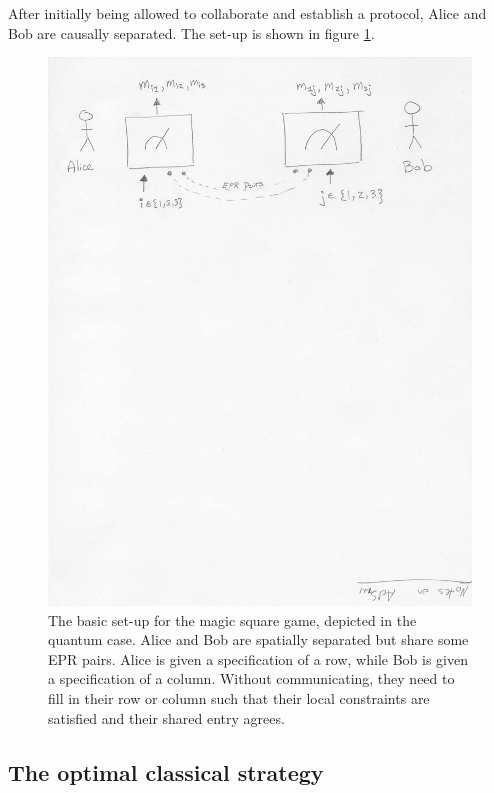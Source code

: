 \documentclass[a4paper,11pt]{article}
\begin{document}
After initially being allowed to collaborate and establish a protocol, Alice and Bob are causally separated. The set-up is shown in figure \ref{fig:setup}. 

\begin{figure}
    \centering
    \includegraphics[scale=0.7]{setup.pdf}
    \caption{The basic set-up for the magic square game, depicted in the quantum case. Alice and Bob are spatially separated but share some EPR pairs. Alice is given a specification of a row, while Bob is given a specification of a column. Without communicating, they need to fill in their row or column such that their local constraints are satisfied and their shared entry agrees.}
    \label{fig:setup}
\end{figure}

\subsection{The optimal classical strategy}
\end{document}

